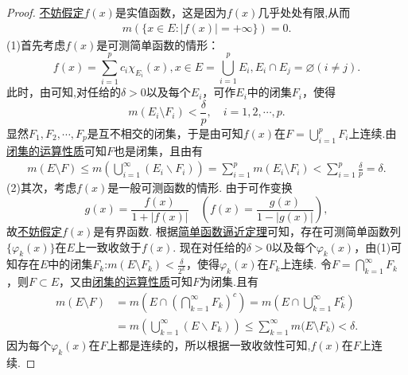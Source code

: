 \documentclass[../../main.tex]{subfiles}%
\begin{document}
\begin{proof}

\hyperlink{不妨假定f是实值函数的原因}{不妨假定}\(f(x)\)是实值函数，这是因为$f(x)$几乎处处有限,从而
\begin{align*}
m(\{x \in E: |f(x)| = +\infty\}) = 0.
\end{align*}
(1)首先考虑\(f(x)\)是可测简单函数的情形：
\[f(x) = \sum_{i = 1}^{p} c_{i} \chi_{E_{i}}(x), x \in E = \bigcup_{i = 1}^{p} E_{i}, E_{i} \cap E_{j} = \varnothing (i \neq j).\]
此时，由可知,对任给的\(\delta > 0\)以及每个\(E_{i}\)，可作\(E_{i}\)中的闭集\(F_{i}\)，使得
\[m(E_{i} \setminus F_{i}) < \frac{\delta}{p}, \quad i = 1,2,\cdots,p.\]
显然\(F_{1},F_{2},\cdots,F_{p}\)是互不相交的闭集，于是由可知\(f(x)\)在\(F = \bigcup_{i = 1}^{p} F_{i}\)上连续.由\hyperref[theorem:闭集的运算性质]{闭集的运算性质}可知\(F\)也是闭集，且由有
\begin{align*}
m(E \setminus F) \leqslant m(\bigcup_{i=1}^{\infty}(E_i\backslash F_i))=\sum_{i = 1}^{p} m(E_{i} \setminus F_{i}) < \sum_{i = 1}^{p} \frac{\delta}{p} = \delta.
\end{align*}
(2)其次，考虑\(f(x)\)是一般可测函数的情形. 由于可作变换
\[g(x) = \frac{f(x)}{1 + |f(x)|} \quad \left(f(x) = \frac{g(x)}{1 - |g(x)|}\right),\]
故\hyperlink{不妨设f有界的原因}{不妨假定}\(f(x)\)是有界函数. 根据\hyperref[theorem:简单函数逼近定理]{简单函数逼近定理}可知，存在可测简单函数列\(\{\varphi_{k}(x)\}\)在\(E\)上一致收敛于\(f(x)\). 现在对任给的\(\delta > 0\)以及每个\(\varphi_{k}(x)\)，由(1)可知存在\(E\)中的闭集\(F_{k}\):\(m(E \setminus F_{k}) < \frac{\delta}{2^{k}}\)，使得\(\varphi_{k}(x)\)在\(F_{k}\)上连续. 令\(F = \bigcap_{k = 1}^{\infty} F_{k}\)，则\(F \subset E\)，又由\hyperref[theorem:闭集的运算性质]{闭集的运算性质}可知$F$为闭集.且有
\begin{align*}
m(E\setminus F)&=m(E\cap \left( \bigcap_{k=1}^{\infty}{F_k} \right) ^c)=m(E\cap \bigcup_{k=1}^{\infty}{F_{k}^{c}})
\\
&=m(\bigcup_{k=1}^{\infty}{\left( E\backslash F_k \right)})\leqslant \sum_{k=1}^{\infty}{m(E}\setminus F_k)<\delta .
\end{align*}
因为每个\(\varphi_{k}(x)\)在\(F\)上都是连续的，所以根据一致收敛性可知,\(f(x)\)在\(F\)上连续. 

\end{proof}
\end{document}
